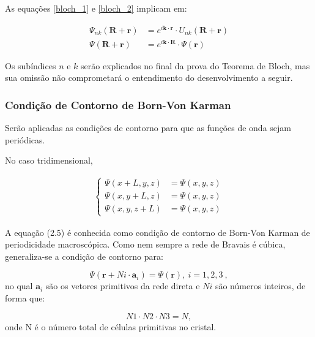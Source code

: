 	As equações \eqref{bloch_1} e \eqref{bloch_2} implicam em:

	\begin{align}
		\label{bloch_3}
		\Psi_{nk}(\mathbf{R} + \mathbf{r}) &= e^{i\mathbf{k} \cdot \mathbf{r}}\cdot U_{nk}(\mathbf{R} + \mathbf{r})\\
		\Psi(\mathbf{R} + \mathbf{r}) &= e^{i\mathbf{k} \cdot \mathbf{R}}\cdot \Psi(\mathbf{r})
	\end{align}

	\par Os subíndices $n$ e $k$ serão explicados no final da prova do Teorema de Bloch, mas sua omissão não comprometará o entendimento do desenvolvimento a seguir.



	\subsubsection{Condição de Contorno de Born-Von Karman}

	\par Serão aplicadas as condições de contorno para que as funções de onda sejam periódicas.
	
	\par No caso tridimensional,

	\begin{align}\label{bloch_4}
        \left\{
          \begin{array}{ll}
            \displaystyle \Psi(x+L, y, z) &= \Psi(x, y, z)\\
            \displaystyle \Psi(x, y+L, z) &= \Psi(x, y, z)\\
            \displaystyle \Psi(x, y, z+L) &= \Psi(x, y, z)
          \end{array}
        \right.
      \end{align}
	
	\par A equação (2.5) é conhecida como condição de contorno de Born-Von Karman de periodicidade macroscópica.  Como nem sempre a rede de Bravais é cúbica, generaliza-se a condição de contorno para:

	\begin{equation}
		\label{blochh_5}
		\Psi(\mathbf{r} + N i\cdot \mathbf{a}_{i}) = \Psi(\mathbf{r}),\ i=1,2,3\ ,
	\end{equation}
	no qual $\mathbf{a}_{i}$ são os vetores primitivos da rede direta e $Ni$ são números inteiros, de forma que:

	\begin{equation}
		\label{bloch_6}
		N1 \cdot N2 \cdot N3 = N,
	\end{equation}
	onde N é o número total de células primitivas no cristal.

